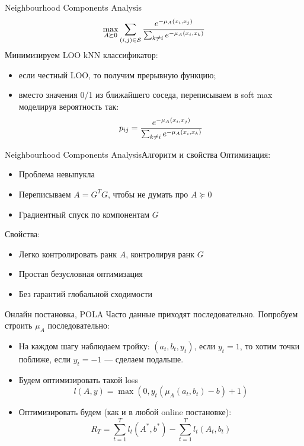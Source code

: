 \documentclass[14pt, fleqn, xcolor={dvipsnames, table}]{beamer}
\begin{document}
\begin{frame}{Neighbourhood Components Analysis}
$$
\max_{A \succeq 0} \sum_{(i,j)\in\mathcal{S}} {e^{-\mu_A(x_i,x_j)} \over \sum_{k\ne i} e^{-\mu_A(x_i, x_k)}}
$$
Минимизируем LOO kNN классификатор:
\small
\begin{itemize}
  \item если честный LOO, то получим прерывную функцию;
  \item вместо значения 0/1 из ближайшего соседа, переписываем в soft max моделируя вероятность так:
  $$
  p_{ij} = {e^{-\mu_A(x_i,x_j)} \over \sum_{k\ne i} e^{-\mu_A(x_i, x_k)}}
  $$
\end{itemize}
\end{frame}

\begin{frame}{Neighbourhood Components Analysis}{Алгоритм и свойства}
Оптимизация:
\begin{itemize}
  \item Проблема невыпукла
  \item Переписываем $A = G^TG$, чтобы не думать про $A \succeq 0$
  \item Градиентный спуск по компонентам $G$
\end{itemize}
Свойства:
\begin{itemize}
  \item Легко контролировать ранк $A$, контролируя ранк $G$
  \item Простая безусловная оптимизация
  \item Без гарантий глобальной сходимости
\end{itemize}
\end{frame}

\begin{frame}{Онлайн постановка, POLA}
Часто данные приходят последовательно. Попробуем строить $\mu_A$ последовательно:
\begin{itemize}
  \item На каждом шагу наблюдаем тройку: $(a_t,b_t,y_t)$, если $y_t = 1$, то хотим точки поближе, если $y_t = -1$ --- сделаем подальше.
  \item Будем оптимизировать такой loss 
  $$
  l(A, y) = \max(0, y_t(\mu_A(a_t,b_t) - b) + 1)
  $$
  \item Оптимизировать будем (как и в любой online постановке):
  $$
  R_T = \sum_{t=1}^{T} l_t(A^*, b^*) - \sum_{t=1}^{T} l_t(A_t, b_t) 
  $$
\end{itemize}
\end{frame}
\end{document}
